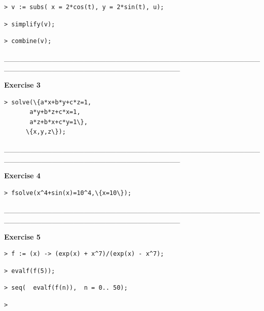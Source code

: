 \documentclass{article}
\begin{document}
\begin{lstlisting}
> v := subs( x = 2*cos(t), y = 2*sin(t), u);
\end{lstlisting}
\begin{lstlisting}
> simplify(v);
\end{lstlisting}
\begin{lstlisting}
> combine(v);
\end{lstlisting}
\begin{Maple Normal}
\_\_\_\_\_\_\_\_\_\_\_\_\_\_\_\_\_\_\_\_\_\_\_\_\_\_\_\_\_\_\_\_\_\_\_\_\_\_\_\_\_\_\_\_\_\_\_\_\_\_\_\_\_\_\_\_\_\_\_\_\_\_\_\_\_\_\_\_\_\_\_\_\_\_\_\_\_\_\_\_\_
\end{Maple Normal}
\begin{Maple Heading 2}
\textbf{Exercise 3}
\end{Maple Heading 2}
\begin{lstlisting}
> solve(\{a*x+b*y+c*z=1,
       a*y+b*z+c*x=1,
       a*z+b*x+c*y=1\},
      \{x,y,z\});
\end{lstlisting}
\begin{Maple Normal}
\_\_\_\_\_\_\_\_\_\_\_\_\_\_\_\_\_\_\_\_\_\_\_\_\_\_\_\_\_\_\_\_\_\_\_\_\_\_\_\_\_\_\_\_\_\_\_\_\_\_\_\_\_\_\_\_\_\_\_\_\_\_\_\_\_\_\_\_\_\_\_\_\_\_\_\_\_\_\_\_\_
\end{Maple Normal}
\begin{Maple Heading 2}
\textbf{Exercise 4}
\end{Maple Heading 2}
\begin{lstlisting}
> fsolve(x^4+sin(x)=10^4,\{x=10\});
\end{lstlisting}
\begin{Maple Normal}
\_\_\_\_\_\_\_\_\_\_\_\_\_\_\_\_\_\_\_\_\_\_\_\_\_\_\_\_\_\_\_\_\_\_\_\_\_\_\_\_\_\_\_\_\_\_\_\_\_\_\_\_\_\_\_\_\_\_\_\_\_\_\_\_\_\_\_\_\_\_\_\_\_\_\_\_\_\_\_\_\_
\end{Maple Normal}
\begin{Maple Heading 2}
\textbf{Exercise 5}
\end{Maple Heading 2}
\begin{lstlisting}
> f := (x) -> (exp(x) + x^7)/(exp(x) - x^7);
\end{lstlisting}
\begin{lstlisting}
> evalf(f(5));
\end{lstlisting}
\begin{lstlisting}
> seq(  evalf(f(n)),  n = 0.. 50);
\end{lstlisting}
\begin{lstlisting}
> 
\end{lstlisting}
\end{document}
